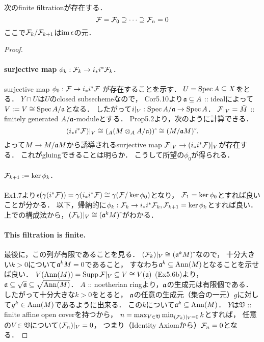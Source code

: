 \documentclass[a4paper]{jsarticle}
\newcommand{\coverV}{\mathfrak{V}}
\begin{document}
    \begin{Claim}
        次のfinite filtrationが存在する．
        \[ \mathcal{F}=\mathcal{F}_0 \supseteq \cdots \supseteq \mathcal{F}_n=0 \]
        ここで$\mathcal{F}_k/\mathcal{F}_{k+1}$は$\operatorname{im} \epsilon$の元．
    \end{Claim}
    \begin{proof}
        \paragraph{surjective map $\phi_k: \mathcal{F}_k \to i_* i^* \mathcal{F}_k$.}
        surjective map $\phi_0: \mathcal{F} \to i_* i^* \mathcal{F}$ が存在することを示す．
        $U=\operatorname{Spec} A \subseteq X$をとる．
        $Y \cap U$は$U$のclosed subsechemeなので，
        Cor5.10より$\mathfrak{a} \subseteq A$ :: idealによって
        $V:=V \cong \operatorname{Spec} A/\mathfrak{a}$となる．
        したがって$i|_{V}: \operatorname{Spec} A/\mathfrak{a} \to \operatorname{Spec} A$．
        $\mathcal{F}|_{V}=\tilde{M}$ :: finitely generated $A/\mathfrak{a}$-moduleとする．
        Prop5.2より，次のように計算できる．
        \[ (i_* i^* \mathcal{F})|_{V} \cong ({}_A(M \otimes_A A/\mathfrak{a}))\,\tilde{}\, \cong (M/\mathfrak{a}M) \,\tilde{}\,. \]
        よって$M \to M/\mathfrak{a}M$から誘導されるsurjective map
        $\mathcal{F}|_{V} \to (i_* i^* \mathcal{F})|_{V}$が存在する．
        これがgluingできることは明らか．
        こうして所望の$\phi_0$が得られる．

        \paragraph{$\mathcal{F}_{k+1}:=\ker \phi_k$.}
        Ex1.7より$\epsilon(\gamma(i^* \mathcal{F}))=\gamma(i_* i^* \mathcal{F}) \cong \gamma(\mathcal{F}/\ker \phi_0)$となり，
        $\mathcal{F}_1=\ker \phi_0$とすれば良いことが分かる．
        以下，帰納的に$\phi_k: \mathcal{F}_k \to i_* i^* \mathcal{F}_k, \mathcal{F}_{k+1}=\ker \phi_k$とすれば良い．
        上での構成法から，$(\mathcal{F}_{k})|_{V} \cong (\mathfrak{a}^{k} M)\,\tilde{}\,$がわかる．

        \paragraph{This filtration is finite.}
        最後に，この列が有限であることを見る．
        $(\mathcal{F}_{k})|_{V} \cong (\mathfrak{a}^{k} M)\,\tilde{}\,$なので，
        十分大きい$k>0$について$\mathfrak{a}^{k} M=0$であること，
        すなわち$\mathfrak{a}^k \subseteq \operatorname{Ann}(M)$となることを示せば良い．
        $V(\operatorname{Ann}(M))=\operatorname{Supp} \mathcal{F}|_{V} \subseteq V \cong V(\mathfrak{a})$ (Ex5.6b)より，
        $\mathfrak{a} \subseteq \sqrt{\mathfrak{a}} \subseteq \sqrt{\operatorname{Ann}(M)}$．
        $A$ :: noetherian ringより，$\mathfrak{a}$の生成元は有限個である．
        したがって十分大きな$k>0$をとると，
        $\mathfrak{a}$の任意の生成元（集合の一元）$g$に対して$g^k \in \operatorname{Ann}(M)$であるように出来る．
        この$k$について$\mathfrak{a}^k \subseteq \operatorname{Ann}(M)$．
        $Y$は$\coverV$ :: finite affine open coverを持つから，
        $n=\max_{V \in \coverV} \min_{(\shF_k)|_V=0} k$とすれば，
        任意の$V \in \coverV$について$(\mathcal{F}_n)|_V=0$，
        つまり（Identity Axiomから）$\mathcal{F}_n=0$となる．
    \end{proof}
\end{document}
